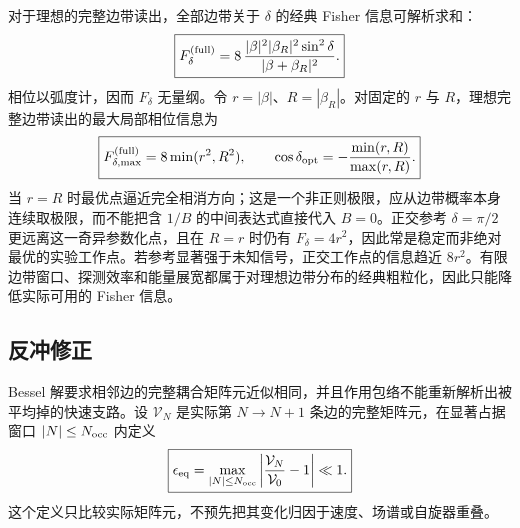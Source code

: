 对于理想的完整边带读出，全部边带关于 $\delta$ 的经典 Fisher 信息可解析求和：
\begin{equation}
 \boxed{
 F_\delta^{\rm(full)}
 =8\,
 \frac{|\beta|^2|\beta_R|^2\sin^2\delta}
 {|\beta+\beta_R|^2}.}
 \label{eq:pinem-reference-phase-fisher-dp31}
\end{equation}
相位以弧度计，因而 $F_\delta$ 无量纲。令 $r=|\beta|$、$R=|\beta_R|$。对固定的 $r$ 与 $R$，理想完整边带读出的最大局部相位信息为
\begin{equation}
 \boxed{
 F_{\delta,\max}^{\rm(full)}=8\min(r^2,R^2),
 \qquad
 \cos\delta_{\rm opt}
 =-\frac{\min(r,R)}{\max(r,R)}.}
 \label{eq:pinem-reference-phase-fisher-optimum-dp32}
\end{equation}
当 $r=R$ 时最优点逼近完全相消方向；这是一个非正则极限，应从边带概率本身连续取极限，而不能把含 $1/B$ 的中间表达式直接代入 $B=0$。正交参考 $\delta=\pi/2$ 更远离这一奇异参数化点，且在 $R=r$ 时仍有 $F_\delta=4r^2$，因此常是稳定而非绝对最优的实验工作点。若参考显著强于未知信号，正交工作点的信息趋近 $8r^2$。有限边带窗口、探测效率和能量展宽都属于对理想边带分布的经典粗粒化，因此只能降低实际可用的 Fisher 信息。

\subsection{反冲修正}

Bessel 解要求相邻边的完整耦合矩阵元近似相同，并且作用包络不能重新解析出被平均掉的快速支路。设 $\mathcal V_N$ 是实际第 $N\to N+1$ 条边的完整矩阵元，在显著占据窗口 $|N|\le N_{\rm occ}$ 内定义
\begin{equation}
\boxed{
\epsilon_{\rm eq}
=\max_{|N|\le N_{\rm occ}}
\left|\frac{\mathcal V_N}{\mathcal V_0}-1\right|\ll1.}
\label{eq:feist2015_equal_rabi_recoil_condition}
\end{equation}
这个定义只比较实际矩阵元，不预先把其变化归因于速度、场谱或自旋器重叠。

